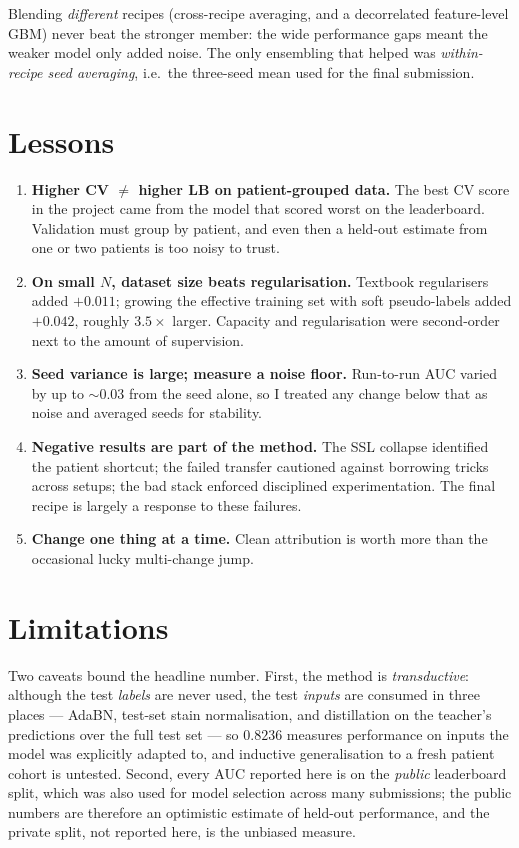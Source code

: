 \documentclass[11pt]{article}
\begin{document}
Blending \emph{different} recipes (cross-recipe averaging, and a decorrelated feature-level GBM) never
beat the stronger member: the wide performance gaps meant the weaker model only added noise. The only
ensembling that helped was \emph{within-recipe seed averaging}, i.e.\ the three-seed mean used for the
final submission.

\section{Lessons}
\label{sec:lessons}

\begin{enumerate}
  \item \textbf{Higher CV $\neq$ higher LB on patient-grouped data.} The best CV score in the project came
        from the model that scored worst on the leaderboard. Validation must group by patient, and even
        then a held-out estimate from one or two patients is too noisy to trust.
  \item \textbf{On small $N$, dataset size beats regularisation.} Textbook regularisers added $+0.011$;
        growing the effective training set with soft pseudo-labels added $+0.042$, roughly
        $3.5\times$ larger. Capacity and regularisation were second-order next to the amount of
        supervision.
  \item \textbf{Seed variance is large; measure a noise floor.} Run-to-run AUC varied by up to
        $\sim\!0.03$ from the seed alone, so I treated any change below that as noise and averaged seeds
        for stability.
  \item \textbf{Negative results are part of the method.} The SSL collapse identified the patient
        shortcut; the failed transfer cautioned against borrowing tricks across setups; the bad stack
        enforced disciplined experimentation. The final recipe is largely a response to these failures.
  \item \textbf{Change one thing at a time.} Clean attribution is worth more than the occasional lucky
        multi-change jump.
\end{enumerate}

\section{Limitations}

Two caveats bound the headline number. First, the method is \emph{transductive}: although the test
\emph{labels} are never used, the test \emph{inputs} are consumed in three places --- AdaBN, test-set
stain normalisation, and distillation on the teacher's predictions over the full test set --- so
$0.8236$ measures performance on inputs the model was explicitly adapted to, and inductive
generalisation to a fresh patient cohort is untested. Second, every AUC reported here is on the
\emph{public} leaderboard split, which was also used for model selection across many submissions; the
public numbers are therefore an optimistic estimate of held-out performance, and the private split, not
reported here, is the unbiased measure.
\end{document}
